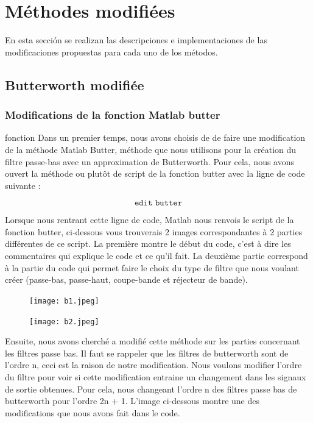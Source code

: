 \documentclass[conference,onecolumn]{IEEEtran}
\begin{document}
\newpage

\section{Méthodes modifiées}
En esta sección se realizan las descripciones e implementaciones de las modificaciones propuestas para cada uno de los métodos.

\subsection{\textbf{Butterworth modifiée}}

\subsubsection{Modifications de la fonction Matlab butter}

fonction Dans un premier temps, nous avons choisis de de faire une modification de la méthode Matlab Butter, méthode que nous utilisons pour la création du filtre passe-bas avec un approximation de Butterworth. Pour cela, nous avons ouvert la méthode ou plutôt de script de la fonction butter avec la ligne de code suivante :

\[ \texttt{edit butter}\]

Lorsque nous rentrant cette ligne de code, Matlab nous renvois le script de la fonction butter, ci-dessous vous trouverais 2 images correspondantes à 2 parties différentes de ce script. La première montre le début du code, c'est à dire les commentaires qui explique le code et ce qu'il fait. La deuxième partie correspond à la partie du code qui permet faire le choix du type de filtre que nous voulant créer (passe-bas, passe-haut, coupe-bande et réjecteur de bande).

 \begin{figure}[H]
 \centering
    \texttt{[image: b1.jpeg]}
\end{figure}


 \begin{figure}[H]
 \centering
    \texttt{[image: b2.jpeg]}
\end{figure}


Ensuite, nous avons cherché a modifié cette méthode sur les parties concernant les filtres passe bas. Il faut se rappeler que les filtres de butterworth sont de l’ordre n, ceci est la raison de notre modification. Nous voulons modifier l’ordre du filtre pour voir si cette modification entraine un changement dans les signaux de sortie obtenues. Pour cela, nous changeant l’ordre n des filtres passe bas de butterworth pour l’ordre 2n + 1. L’image ci-dessous montre une des modifications que nous avons fait dans le code.
\end{document}
